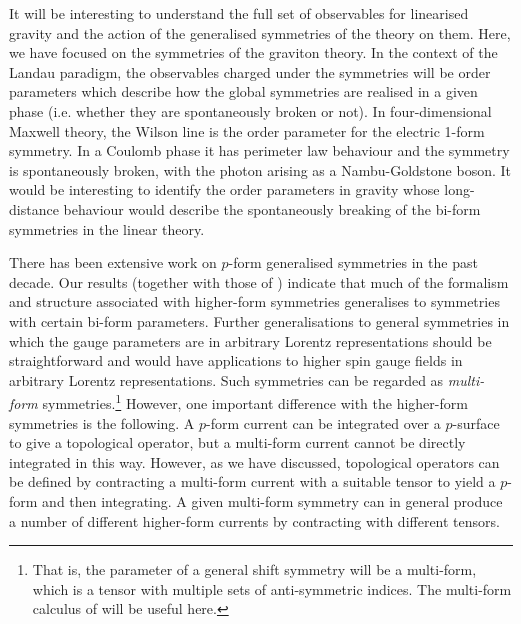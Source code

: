 It will be interesting to understand the full set of observables for linearised gravity and the action of the generalised symmetries of the theory on them. 
Here, we have focused on the symmetries of the graviton theory. In the context of the Landau paradigm, the observables charged under the symmetries will be order parameters which describe how the global symmetries are realised in a given phase (i.e. whether they are spontaneously broken or not). In four-dimensional Maxwell theory, the Wilson line is the order parameter for the electric 1-form symmetry. In a Coulomb phase it has perimeter law behaviour and the symmetry is spontaneously broken, with the photon arising as a Nambu-Goldstone boson. It would be interesting to identify the order parameters in gravity whose long-distance behaviour would describe the spontaneously breaking of the bi-form symmetries in the linear theory.

There has been extensive work on $p$-form generalised symmetries in the past decade. Our results (together with those of \cite{Hinterbichler2023GravitySymmetries, Hinterbichler:2024cxn}) indicate that much of the formalism and structure associated with higher-form symmetries generalises to symmetries with certain bi-form parameters.
Further generalisations to general symmetries in which the gauge parameters are in arbitrary Lorentz representations should be straightforward and would have applications to higher spin gauge fields in arbitrary Lorentz representations. 
Such symmetries can be regarded as \emph{multi-form} symmetries.\footnote{That is, the parameter of a general shift symmetry will be a multi-form, which is a tensor with multiple sets of anti-symmetric indices. The multi-form calculus of \cite{Medeiros2003ExoticDuality} will be useful here.}
However, one important difference with the higher-form symmetries is the following.
A $p$-form current can be integrated over a $p$-surface to give a topological operator, but a multi-form current cannot be directly integrated in this way.
However, as we have discussed, topological operators can be defined by contracting a multi-form current with a suitable tensor to yield a $p$-form and then integrating. A given multi-form symmetry can in general produce a number of different higher-form currents by contracting with different tensors.


